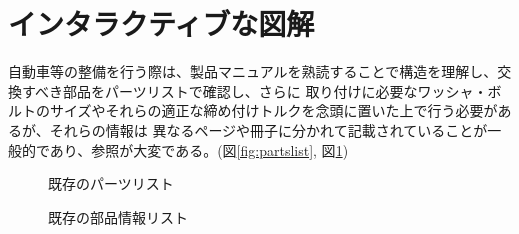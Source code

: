 \section{インタラクティブな図解}
\label{drawiki:zukai}
自動車等の整備を行う際は、製品マニュアルを熟読することで構造を理解し、交換すべき部品をパーツリストで確認し、さらに
取り付けに必要なワッシャ・ボルトのサイズやそれらの適正な締め付けトルクを念頭に置いた上で行う必要があるが、それらの情報は
異なるページや冊子に分かれて記載されていることが一般的であり、参照が大変である。(図\ref{fig:partslist}, 図\ref{fig:manual})

\begin{figure}[H] \begin{minipage}{0.5\hsize}
                      \begin{center} 
                      \end{center} \caption{既存のパーツリスト} \label{fig:partslist}
\end{minipage} \begin{minipage}{0.5\hsize}
                   \begin{center} 
                   \end{center} \caption{既存の部品情報リスト} \label{fig:manual}
\end{minipage}
\end{figure}

